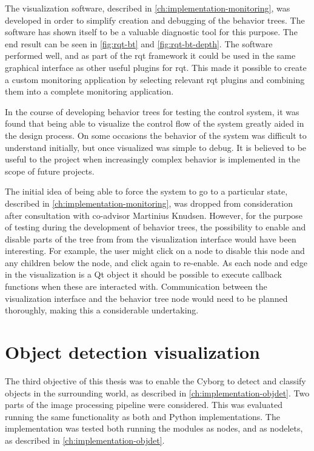 \documentclass[\rootfolder/main.tex]{subfiles}
\begin{document}
The visualization software, described in \cref{ch:implementation-monitoring}, was developed in order to simplify creation and debugging of the behavior trees.
The software has shown itself to be a valuable diagnostic tool for this purpose.
The end result can be seen in \cref{fig:rqt-bt} and \cref{fig:rqt-bt-depth}.
The software performed well, and as part of the rqt framework it could be used in the same graphical interface as other useful plugins for rqt.
This made it possible to create a custom monitoring application by selecting relevant rqt plugins and combining them into a complete monitoring application.

In the course of developing behavior trees for testing the control system, it was found that being able to visualize the control flow of the system greatly aided in the design process.
On some occasions the behavior of the system was difficult to understand initially, but once visualized was simple to debug.
It is believed to be useful to the project when increasingly complex behavior is implemented in the scope of future projects.

The initial idea of being able to force the system to go to a particular state, described in \cref{ch:implementation-monitoring}, was dropped from consideration after consultation with co-advisor Martinius Knudsen.
However, for the purpose of testing during the development of behavior trees, the possibility to enable and disable parts of the tree from from the visualization interface would have been interesting.
For example, the user might click on a node to disable this node and any children below the node, and click again to re-enable.
As each node and edge in the visualization is a Qt object it should be possible to execute callback functions when these are interacted with.
Communication between the visualization interface and the behavior tree node would need to be planned thoroughly, making this a considerable undertaking.


\section{Object detection visualization}

The third objective of this thesis was to enable the Cyborg to detect and classify objects in the surrounding world, as described in \cref{ch:implementation-objdet}.
Two parts of the image processing pipeline were considered.
This was evaluated running the same functionality as both \CC and Python implementations.
The \CC implementation was tested both running the modules as nodes, and as nodelets, as described in \cref{ch:implementation-objdet}.
\end{document}
